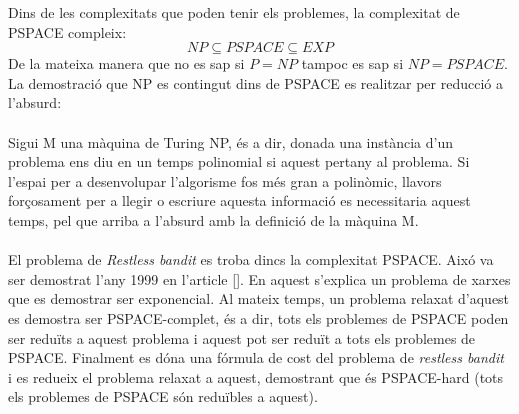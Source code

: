 
	Dins de les complexitats que poden tenir els problemes, la complexitat de PSPACE compleix:
	\[
	{NP} \subseteq PSPACE \subseteq {EXP} %
	\]
	De la mateixa manera que no es sap si $P = NP$ tampoc es sap si $NP = PSPACE$. La demostració que NP es contingut dins de
	PSPACE es realitzar per reducció a l'absurd:\\
	\\
	 Sigui M una màquina de Turing NP, és a dir, donada una instància d'un problema ens diu en un temps 
	polinomial si aquest pertany al problema. Si l'espai per a desenvolupar l'algorisme fos més gran a polinòmic, llavors forçosament
	per a llegir o escriure aquesta informació es necessitaria aquest temps, pel que arriba a l'absurd amb la definició de la màquina M. %
	\\
	\\
	El problema de \textit{Restless bandit} es troba dincs la complexitat PSPACE. Aixó va ser demostrat l'any 1999 en l'article [].%
	En aquest s'explica un problema de xarxes que es demostrar ser exponencial. Al mateix temps, un problema relaxat d'aquest
	es demostra ser PSPACE-complet, és a dir, tots els problemes de PSPACE poden ser reduïts a aquest problema i aquest pot
	ser reduït a tots els problemes de PSPACE. Finalment es dóna una fórmula de cost del problema de \textit{restless bandit} i
	es redueix el problema relaxat a aquest, demostrant que és PSPACE-hard (tots els problemes de PSPACE són
	reduïbles a aquest). %
	
